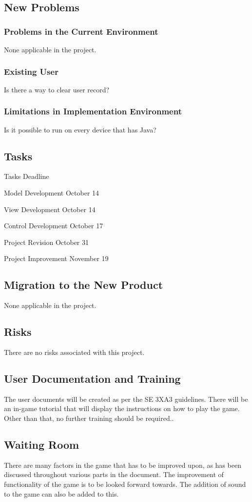 \documentclass[12pt,letterpaper]{article}
\begin{document}
\subsection{New Problems}
\subsubsection{Problems in the Current Environment}
None applicable in the project.
\subsubsection{Existing User}
Is there a way to clear user record?
\subsubsection{Limitations in Implementation Environment} 
Is it possible to run on every device that has Java?
\subsection{Tasks}
Tasks Deadline

Model Development October 14

View Development October 14

Control Development October 17

Project Revision October 31

Project Improvement November 19
\subsection{Migration to the New Product}
None applicable in the project.
\subsection{Risks}
There are no risks associated with this project.
\subsection{User Documentation and Training}
The user documents will be created as per the SE 3XA3 guidelines.
There will be an in-game tutorial that will display the instructions on how to play the game. Other than that, no further training should be required..
\subsection{Waiting Room}
There are many factors in the game that has to be improved upon, as has been discussed throughout various parts in the document. The improvement of functionality of the game is to be looked forward towards. The addition of sound to the game can also be added to this.
\end{document}
